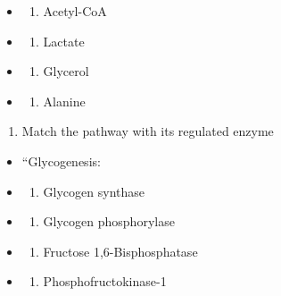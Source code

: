 \documentclass[
]{book}
\providecommand{\tightlist}{%
  \setlength{\itemsep}{0pt}\setlength{\parskip}{0pt}}
\begin{document}
\begin{itemize}
\tightlist
\item
  \begin{enumerate}
  \def\labelenumi{(\Alph{enumi})}
  \tightlist
  \item
    Acetyl-CoA\\
  \end{enumerate}
\item
  \begin{enumerate}
  \def\labelenumi{(\Alph{enumi})}
  \setcounter{enumi}{1}
  \tightlist
  \item
    Lactate\\
  \end{enumerate}
\item
  \begin{enumerate}
  \def\labelenumi{(\Alph{enumi})}
  \setcounter{enumi}{2}
  \tightlist
  \item
    Glycerol\\
  \end{enumerate}
\item
  \begin{enumerate}
  \def\labelenumi{(\Alph{enumi})}
  \setcounter{enumi}{3}
  \tightlist
  \item
    Alanine
  \end{enumerate}
\end{itemize}

\begin{enumerate}
\def\labelenumi{\arabic{enumi}.}
\setcounter{enumi}{1}
\tightlist
\item
  Match the pathway with its regulated enzyme
\end{enumerate}

\begin{itemize}
\item
  ``Glycogenesis:
\item
  \begin{enumerate}
  \def\labelenumi{(\Alph{enumi})}
  \tightlist
  \item
    Glycogen synthase\\
  \end{enumerate}
\item
  \begin{enumerate}
  \def\labelenumi{(\Alph{enumi})}
  \setcounter{enumi}{1}
  \tightlist
  \item
    Glycogen phosphorylase\\
  \end{enumerate}
\item
  \begin{enumerate}
  \def\labelenumi{(\Alph{enumi})}
  \setcounter{enumi}{2}
  \tightlist
  \item
    Fructose 1,6-Bisphosphatase\\
  \end{enumerate}
\item
  \begin{enumerate}
  \def\labelenumi{(\Alph{enumi})}
  \setcounter{enumi}{3}
  \tightlist
  \item
    Phosphofructokinase-1
  \end{enumerate}
\end{itemize}
\end{document}
